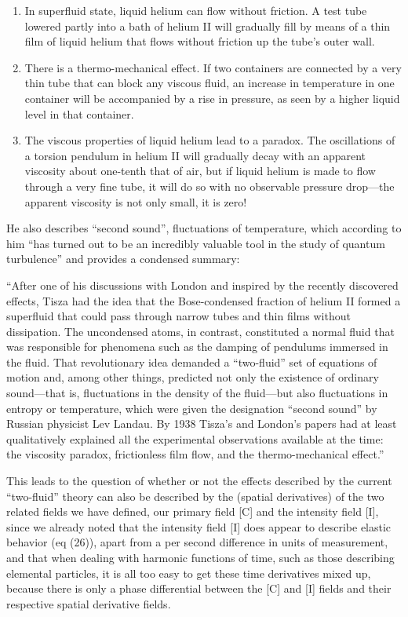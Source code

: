 \documentclass{article}
\begin{document}
\begin{enumerate}
\item In superfluid state, liquid helium can flow without friction. A test tube lowered partly into a bath of helium II
will gradually fill by means of a thin film of liquid helium that flows without friction up the tube's outer wall.
\item There is a thermo-mechanical effect. If two containers are connected by a very thin tube that can block any
viscous fluid, an increase in temperature in one container will be accompanied by a rise in pressure, as seen by a
higher liquid level in that container.
\item The viscous properties of liquid helium lead to a paradox. The oscillations of a torsion pendulum in helium II
will gradually decay with an apparent viscosity about one-tenth that of air, but if liquid helium is made to flow
through a very fine tube, it will do so with no observable pressure drop---the apparent viscosity is not only small, it
is zero!
\end{enumerate}
He also describes ``second sound'', fluctuations of temperature, which according to him ``has turned out to be an
incredibly valuable tool in the study of quantum turbulence'' and provides a condensed summary:

{}``After one of his discussions with London and inspired by the recently discovered effects, Tisza had the idea that
the Bose-condensed fraction of helium II formed a superfluid that could pass through narrow tubes and thin films
without dissipation. The uncondensed atoms, in contrast, constituted a normal fluid that was responsible for phenomena
such as the damping of pendulums immersed in the fluid. That revolutionary idea demanded a ``two-fluid'' set of
equations of motion and, among other things, predicted not only the existence of ordinary sound---that is, fluctuations
in the density of the fluid---but also fluctuations in entropy or temperature, which were given the designation
``second sound'' by Russian physicist Lev Landau. By 1938 Tisza's and London's papers had at least qualitatively
explained all the experimental observations available at the time: the viscosity paradox, frictionless film flow, and
the thermo-mechanical effect.''

This leads to the question of whether or not the effects described by the current ``two-fluid'' theory can also be
described by the (spatial derivatives) of the two related fields we have defined, our primary field [C] and the
intensity field [I], since we already noted that the intensity field [I] does appear to describe elastic behavior (eq
(26)), apart from a per second difference in units of measurement, and that when dealing with harmonic functions of
time, such as those describing elemental particles, it is all too easy to get these time derivatives mixed up, because
there is only a phase differential between the [C] and [I] fields and their respective spatial derivative fields. 
\end{document}
